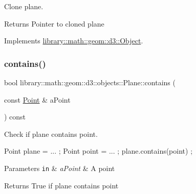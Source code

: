 Clone plane. 

\begin{DoxyReturn}{Returns}
Pointer to cloned plane 
\end{DoxyReturn}


Implements \hyperlink{classlibrary_1_1math_1_1geom_1_1d3_1_1_object_a1a784c6b359e0eb97cd34fabc42f2f3f}{library\+::math\+::geom\+::d3\+::\+Object}.

\mbox{\label{classlibrary_1_1math_1_1geom_1_1d3_1_1objects_1_1_plane_a7bb2f2a298461ee30c77ad653cfd195a}} 
\subsubsection{\texorpdfstring{contains()}{contains()}}
{\footnotesize\ttfamily bool library\+::math\+::geom\+::d3\+::objects\+::\+Plane\+::contains (\begin{DoxyParamCaption}\item[{const \hyperlink{classlibrary_1_1math_1_1geom_1_1d3_1_1objects_1_1_point}{Point} \&}]{a\+Point }\end{DoxyParamCaption}) const}



Check if plane contains point. 


\begin{DoxyCode}
Point plane = ... ;
Point point = ... ;
plane.contains(point) ;
\end{DoxyCode}



\begin{DoxyParams}[1]{Parameters}
\mbox{\tt in}  & {\em a\+Point} & A point \\
\hline
\end{DoxyParams}
\begin{DoxyReturn}{Returns}
True if plane contains point 
\end{DoxyReturn}
\mbox{\label{classlibrary_1_1math_1_1geom_1_1d3_1_1objects_1_1_plane_a9d34608a389d4c80dad6b6f58b82c0e4}} 
